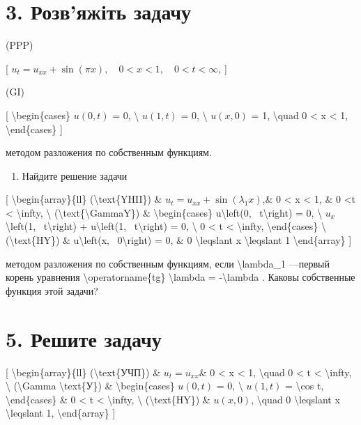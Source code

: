\documentclass[
]{article}
\providecommand{\tightlist}{%
  \setlength{\itemsep}{0pt}\setlength{\parskip}{0pt}}
\begin{document}
{{\section{3. Розв'яжіть
задачу}\label{ux440ux43eux437ux432ux44fux436ux456ux442ux44c-ux437ux430ux434ux430ux447ux443}

(PPP)

{[}
\(u_t = u_{xx} + \sin(\pi x), \quad 0 < x < 1, \quad 0 < t < \infty\),
{]}

(GI)

{[} \textbackslash begin\{cases\} \(u(0, t)\) = 0, \textbackslash{}
\(u(1, t)\) = 0, \textbackslash{} \(u(x, 0)\) = 1, \textbackslash quad 0
\textless{} x \textless{} 1, \textbackslash end\{cases\} {]}

методом разложения по собственным функциям.

\begin{enumerate}
\def\labelenumi{\arabic{enumi}.}
\setcounter{enumi}{3}
\tightlist
\item
  Найдите решение задачи
\end{enumerate}

{[} \textbackslash begin\{array\}\{ll\} (\textbackslash text\{YHII\}) \&
\(u_t = u_{xx} + \sin{(\lambda_1 x)}\),\& 0 \textless{} x \textless{} 1,
\& 0 \textless t \textless{} \textbackslash infty, \textbackslash{}
(\textbackslash text\{\textbackslash GammaY\}) \&
\textbackslash begin\{cases\} u\textbackslash left(0,
~t\textbackslash right) = 0, \textbackslash{}
\(u_x\)\textbackslash left(1, ~t\textbackslash right) +
u\textbackslash left(1, ~t\textbackslash right) = 0, \textbackslash{} 0
\textless{} t \textless{} \textbackslash infty,
\textbackslash end\{cases\} \textbackslash{} (\textbackslash text\{HY\})
\& u\textbackslash left(x, ~0\textbackslash right) = 0, \& 0
\textbackslash leqslant x \textbackslash leqslant 1
\textbackslash end\{array\} {]}

методом разложения по собственным функциям, если
\textbackslash lambda\_1 ---первый корень уравнения
\textbackslash operatorname\{tg\} \textbackslash lambda =
-\textbackslash lambda . Каковы собственные функция этой задачи?

\section{5. Решите
задачу}\label{ux440ux435ux448ux438ux442ux435-ux437ux430ux434ux430ux447ux443}

{[} \textbackslash begin\{array\}\{ll\} (\textbackslash text\{УЧП\}) \&
\(u_t = u_{xx}\)\& 0 \textless{} x \textless{} 1, \textbackslash quad 0
\textless{} t \textless{} \textbackslash infty, \textbackslash{}
(\textbackslash Gamma \textbackslash text\{У\}) \&
\textbackslash begin\{cases\} \(u(0, t)\) = 0, \textbackslash{}
\(u(1, t)\) = \textbackslash cos t, \textbackslash end\{cases\} \& 0
\textless{} t \textless{} \textbackslash infty, \textbackslash{}
(\textbackslash text\{HY\}) \& \(u(x, 0)\), \textbackslash quad 0
\textbackslash leqslant x \textbackslash leqslant 1,
\textbackslash end\{array\} {]}

}}
\end{document}
